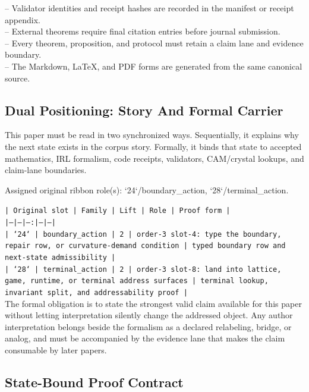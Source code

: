 \documentclass[11pt]{article}
\begin{document}
\noindent{}-- Validator identities and receipt hashes are recorded in the manifest or receipt appendix.\\
\noindent{}-- External theorems require final citation entries before journal submission.\\
\noindent{}-- Every theorem, proposition, and protocol must retain a claim lane and evidence boundary.\\
\noindent{}-- The Markdown, LaTeX, and PDF forms are generated from the same canonical source.\\

\subsection*{Dual Positioning: Story And Formal Carrier}

This paper must be read in two synchronized ways. Sequentially, it explains why
the next state exists in the corpus story. Formally, it binds that state to
accepted mathematics, IRL formalism, code receipts, validators, CAM/crystal
lookups, and claim-lane boundaries.

Assigned original ribbon role(s): `24`/boundary\_action, `28`/terminal\_action.

\noindent\texttt{| Original slot | Family | Lift | Role | Proof form |}\\
\noindent\texttt{|---|---|---:|---|---|}\\
\noindent\texttt{| `24` | boundary\_action | 2 | order-3 slot-4: type the boundary, repair row, or curvature-demand condition | typed boundary row and next-state admissibility |}\\
\noindent\texttt{| `28` | terminal\_action | 2 | order-3 slot-8: land into lattice, game, runtime, or terminal address surfaces | terminal lookup, invariant split, and addressability proof |}\\

The formal obligation is to state the strongest valid claim available for this
paper without letting interpretation silently change the addressed object. Any
author interpretation belongs beside the formalism as a declared relabeling,
bridge, or analog, and must be accompanied by the evidence lane that makes the
claim consumable by later papers.

\subsection*{State-Bound Proof Contract}
\end{document}
